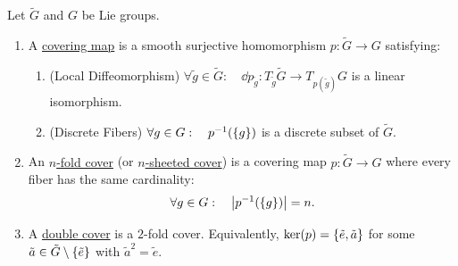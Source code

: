 \documentclass[11pt,reqno]{amsart}
\begin{document}
\begin{Def}\label{def:covering-map}
Let $\tilde G$ and $G$ be Lie groups.
\begin{enumerate}
\item A \ul{covering map} is a smooth surjective homomorphism
$p:\tilde G\to G$ satisfying:
\begin{enumerate}
\item[(i)] (Local Diffeomorphism)
$\forall\tilde g\in\tilde G:\quad
\dd p_{\tilde g}:T_{\tilde g}\tilde G\to T_{p(\tilde g)}G$ is a linear isomorphism.
\item[(ii)] (Discrete Fibers)
$\forall g\in G:\quad p^{-1}(\set{g})$ is a discrete subset of $\tilde G$.
\end{enumerate}

\item An \ul{$n$-fold cover} (or \ul{$n$-sheeted cover}) is a covering map
$p:\tilde G\to G$ where every fiber has the same cardinality:
\[
\forall g\in G:\quad\abs{p^{-1}(\set{g})}=n.
\]

\item A \ul{double cover} is a $2$-fold cover.
Equivalently, $\ker\Br{p}=\set{\tilde e,\tilde a}$ for some
$\tilde a\in\tilde G\setminus\set{\tilde e}$ with $\tilde a^2=\tilde e$.
\end{enumerate}
\end{Def}
\end{document}
